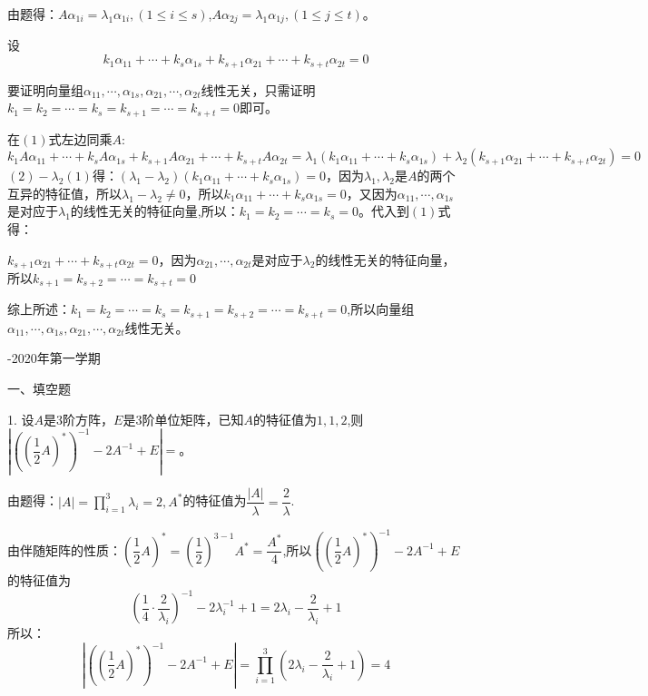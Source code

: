 \documentclass{article}
\begin{document}
\begin{zhengming}
由题得：$A\alpha_ {1i}=\lambda_{1}\alpha_ {1i},(1\leq i\leq s)$,$A\alpha_ {2j}=\lambda_{1}\alpha_ {1j},(1\leq j\leq t)$。

设
\begin{equation*}
k_1\alpha_ {11}+\cdots+k_s\alpha_ {1s}+k_{s+1}\alpha_ {21}+\cdots+k_{s+t}\alpha_{2t}=0\tag{$1$}
\end{equation*}

要证明向量组$\alpha_{11},\cdots,\alpha_{1s},\alpha_{21},\cdots,\alpha_{2t}$线性无关，只需证明$k_1=k_2=\cdots=k_s=k_{s+1}=\cdots=k_{s+t}=0$即可。

在$(1)$式左边同乘$A$:
\begin{equation*}
  k_1A\alpha_ {11}+\cdots+k_sA\alpha_ {1s}+k_{s+1}A\alpha_ {21}+\cdots+k_{s+t}A\alpha_{2t}=\lambda_{1}(k_1\alpha_ {11}+\cdots+k_s\alpha_ {1s})+\lambda_{2}(k_{s+1}\alpha_ {21}+\cdots+k_{s+t}\alpha_{2t})=0\tag{$2$}
\end{equation*}
$(2)-\lambda_{2}(1)$得：$(\lambda_1-\lambda_2)(k_1\alpha_ {11}+\cdots+k_s\alpha_ {1s})=0$，因为$\lambda_{1},\lambda_{2}$是$A$的两个互异的特征值，所以$\lambda_1-\lambda_2\neq0$，所以$k_1\alpha_ {11}+\cdots+k_s\alpha_ {1s}=0$，又因为$\alpha_ {11},\cdots,\alpha_ {1s}$是对应于$\lambda_{1}$的线性无关的特征向量,所以：$k_1=k_2=\cdots=k_{s}=0$。代入到$(1)$式得：

$k_{s+1}\alpha_ {21}+\cdots+k_{s+t}\alpha_{2t}=0$，因为$\alpha_ {21},\cdots,\alpha_ {2t}$是对应于$\lambda_{2}$的线性无关的特征向量，所以$k_{s+1}=k_{s+2}=\cdots=k_{s+t}=0$

综上所述：$k_1=k_2=\cdots=k_{s}=k_{s+1}=k_{s+2}=\cdots=k_{s+t}=0$,所以向量组$\alpha_{11},\cdots,\alpha_{1s},\alpha_{21},\cdots,\alpha_{2t}$线性无关。
\end{zhengming}
\newpage
\hphantom{~~}\hfill {-2020年第一学期} \hfill\hphantom{~~}

一、填空题

1. 设$A$是3阶方阵，$E$是3阶单位矩阵，已知$A$的特征值为$1,1,2$,则$\left|\left(\left(\dfrac{1}{2}A\right)^{*}\right)^{-1}-2A^{-1}+E\right|= $\underline{\hphantom{~~~~~~~~~~}}。

\begin{jie}
由题得：$|A|=\prod\limits_{i=1}^{3}\lambda_{i}=2,A^*$的特征值为$\dfrac{|A|}{\lambda}=\dfrac{2}{\lambda}$.

由伴随矩阵的性质：$\left(\dfrac{1}{2}A\right)^*=\left(\dfrac{1}{2}\right)^{3-1}A^*=\dfrac{A^*}{4}$,所以$\left(\left(\dfrac{1} {2}A\right)^{*}\right)^{-1}-2A^{-1}+E $的特征值为
\begin{equation*}
\left(\dfrac{1} {4}\cdot\dfrac{2}{\lambda_{i}}\right)^{-1}-2\lambda_{i}^{-1}+1=2\lambda_{i}-\dfrac{2}{\lambda_i}+1
\end{equation*}
所以：
\begin{equation*}
  \left|\left(\left(\dfrac{1} {2}A\right)^{*}\right)^{-1}-2A^{-1}+E\right|=\prod_{i=1}^{3}\left(2\lambda_{i}-\dfrac{2}{\lambda_i}+1\right)=4
\end{equation*}
\end{jie}
\end{document}
